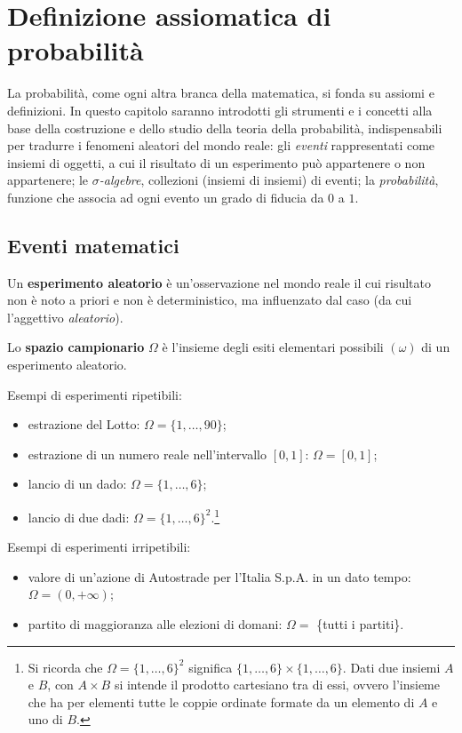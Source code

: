 \section{Definizione assiomatica di probabilità}

La probabilità, come ogni altra branca della matematica, si fonda su assiomi e definizioni. In questo capitolo saranno introdotti gli strumenti e i concetti alla base della costruzione e dello studio della teoria della probabilità, indispensabili per tradurre i fenomeni aleatori del mondo reale:
gli \emph{eventi} rappresentati come insiemi di oggetti, a cui il risultato di un esperimento può appartenere o non appartenere;
le \emph{$\sigma$-algebre}, collezioni (insiemi di insiemi) di eventi;
la \emph{probabilità}, funzione che associa ad ogni evento un grado di fiducia da $0$ a $1$.

\subsection{Eventi matematici}
\begin{defn}
  Un \textbf{esperimento aleatorio} è un'osservazione nel mondo reale il cui risultato non è noto a priori e non è deterministico, ma influenzato dal caso (da cui l'aggettivo \textit{aleatorio}).
\end{defn}

\begin{defn}
  Lo \textbf{spazio campionario} $\Omega$ è l'insieme degli esiti elementari possibili $(\omega)$ di un esperimento aleatorio.
\end{defn}

Esempi di esperimenti ripetibili:
\begin{itemize}
  \item estrazione del Lotto: $\Omega = \{1, \dots, 90\}$;
  \item estrazione di un numero reale nell'intervallo $[0,1]$: $\Omega = [0, 1]$;
  \item lancio di un dado: $\Omega = \{1, \dots, 6\}$;
  \item lancio di due dadi: $\Omega = \{1, \dots, 6\}^2$.\footnote{Si ricorda che  $\Omega = \{1, \dots, 6\}^2$ significa $ \{1, \dots, 6\} \times \{1, \dots, 6\}$.
  	Dati due insiemi $A$  e $B$, con $A \times B$ si intende il prodotto cartesiano tra di essi, ovvero l'insieme che ha per elementi tutte le coppie ordinate formate da un elemento di $A$ e uno di $B$.}
\end{itemize}
Esempi di esperimenti irripetibili:
\begin{itemize}
  \item valore di un'azione di Autostrade per l'Italia S.p.A. in un dato tempo: $\Omega = (0, +\infty)$;
  \item partito di maggioranza alle elezioni di domani: $\Omega = $ \{tutti i partiti\}.
\end{itemize}

